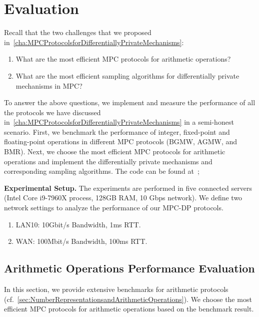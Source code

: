 \chapter{Evaluation}
\label{cha:evaluation}

Recall that the two challenges that we proposed in~\autoref{cha:MPCProtocolsforDifferentiallyPrivateMechanisms}:
\begin{enumerate}
    \item What are the most efficient MPC protocols for arithmetic operations?
    \item What are the most efficient sampling algorithms for differentially private mechanisms in MPC?
\end{enumerate}

To answer the above questions, we implement and measure the performance of all the protocols we have discussed in~\autoref{cha:MPCProtocolsforDifferentiallyPrivateMechanisms} in a semi-honest scenario.
First, we benchmark the performance of integer, fixed-point and floating-point operations in different MPC protocols (BGMW, AGMW, and BMR).
Next, we choose the most efficient MPC protocols for arithmetic operations and implement the differentially private mechanisms and corresponding sampling algorithms.
The code can be found at~\cite{SecurelyRealizingOutputPrivacyinMPC2022};



\textbf{Experimental Setup.}
The experiments are performed in five connected servers (Intel Core i9-7960X process, 128GB RAM, 10 Gbps network). We define two network settings to analyze the performance of our MPC-DP protocols.
\begin{enumerate}
    \item LAN10: 10Gbit/s Bandwidth, 1ms RTT.
    \item WAN: 100Mbit/s Bandwidth, 100ms RTT.
\end{enumerate}

\section{Arithmetic Operations Performance Evaluation}
\label{sec:ArithmeticOperationsPerformanceEvaluation}
In this section, we provide extensive benchmarks for arithmetic protocols (cf.~\autoref{sec:NumberRepresentationsandArithmeticOperations}).
We choose the most efficient MPC protocols for arithmetic operations based on the benchmark result.


